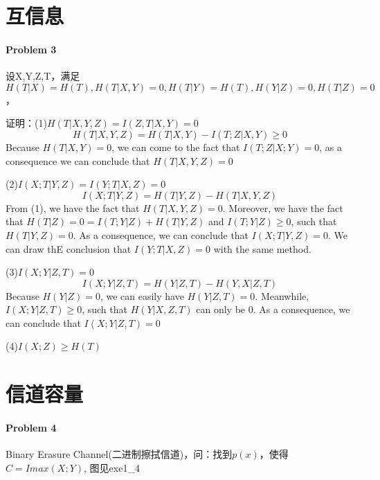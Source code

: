 \documentclass[a4paper, 12pt]{article}
\begin{document}
    \section{互信息}
    \paragraph{Problem 3} 设X,Y,Z,T，满足$H(T|X)=H(T),H(T|X,Y)=0,H(T|Y)=H(T),H(Y|Z)=0,H(T|Z)=0$，
    
    证明：(1)$H(T|X,Y,Z)=I(Z,T|X,Y)=0$
    \[H(T|X,Y,Z)=H(T|X,Y)-I(T;Z|X,Y)\ge 0\]
    Because $H(T|X,Y)=0$, we can come to the fact that $I(T;Z|X;Y)=0$, as a consequence we can conclude that $H(T|X,Y,Z)=0$

    (2)$I(X;T|Y,Z)=I(Y;T|X,Z)=0$
    \[I(X;T|Y,Z)=H(T|Y,Z)-H(T|X,Y,Z)\]
    From (1), we have the fact that $H(T|X,Y,Z)=0$. Moreover, we have the fact that 
    $H(T|Z)=0=I(T;Y|Z)+H(T|Y,Z)$ and $I(T;Y|Z) \ge 0$, such that $H(T|Y,Z)=0$. As a consequence,
    we can conclude that $I(X;T|Y,Z)=0$. We can draw thE conclusion that $I(Y;T|X,Z)=0$ with 
    the same method.

    (3)$I(X;Y|Z,T)=0$
    \[I(X;Y|Z,T)=H(Y|Z,T)-H(Y,X|Z,T)\]
    Because $H(Y|Z)=0$, we can easily have $H(Y|Z,T)=0$. Meanwhile, $I(X;Y|Z,T)\ge 0$,
    such that $H(Y|X,Z,T)$ can only be 0. As a consequence, we can conclude that $I(X;Y|Z,T)=0$

    (4)$I(X;Z)\ge H(T)$
    \section{信道容量}
    \paragraph{Problem 4} Binary Erasure Channel(二进制擦拭信道)，问：找到$p(x)$，使得$C=Imax(X;Y)$, 图见exe1\_4
\end{document}
